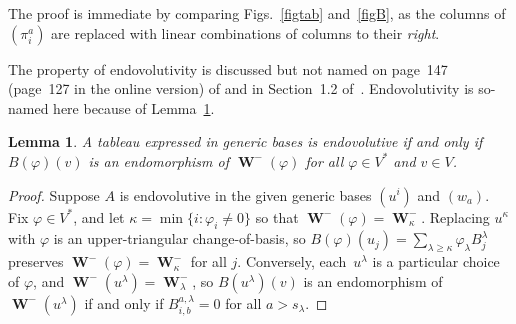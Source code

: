 \documentclass[11pt]{article}
\numberwithin{equation}{section}
\newtheorem{Lemma}[Theorem]{Lemma}
{\theoremstyle{definition}
\newtheorem{Definition}[Theorem]{Definition} }
\DeclareMathOperator{\Wu}{\mathbf{W}}
\begin{document}
The proof is immediate by comparing Figs.~\ref{figtab} and~\ref{figB}, as
the columns of $(\pi^a_i)$ are replaced with linear combinations of columns to
their \emph{right}.

The property of endovolutivity is discussed but not named on page~147 (page~127 in
the online version) of \cite{BCGGG} and in Section~1.2 of~\cite{Yang1987}.
Endovolutivity is so-named here because of Lemma~\ref{lem:endolemma}.

\begin{Lemma}\label{lem:endolemma}
A tableau expressed in generic bases is endovolutive if and only if
$B(\varphi)(v)$ is an endomorphism of $\Wu^-(\varphi)$ for all
$\varphi \in V^*$ and $v \in V$.
\end{Lemma}

\begin{proof}
Suppose $A$ is endovolutive in the given generic bases $(u^i)$ and $(w_a)$.
Fix $\varphi \in V^*$, and let $\kappa = \min
\{ i\colon \varphi_i \neq 0\}$ so that $\Wu^-(\varphi) = \Wu^-_\kappa$.
Replacing $u^\kappa$ with $\varphi$ is an upper-triangular
change-of-basis, so $B(\varphi)(u_j) = \sum\limits_{\lambda \geq \kappa} \varphi_\lambda B^\lambda_j$
preserves $\Wu^-(\varphi)=\Wu^-_{\kappa}$ for all $j$.
Conversely, each~$u^\lambda$ is a particular
choice of $\varphi$, and $\Wu^-(u^\lambda) = \Wu^-_\lambda$, so
$B(u^\lambda)(v)$ is an endomorphism of $\Wu^-(u^\lambda)$ if and only if
$B^{a,\lambda}_{i,b}=0$ for all $a > s_\lambda$.
\end{proof}
\end{document}
